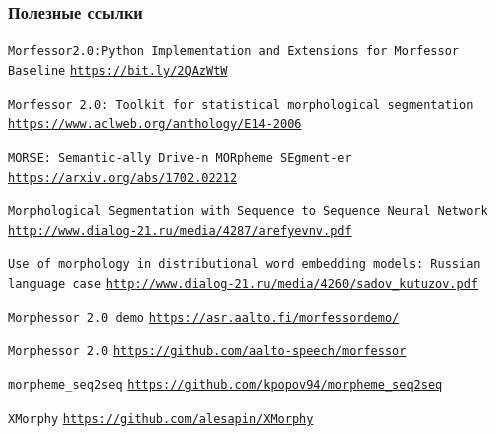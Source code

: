 \documentclass[10pt]{beamer}
\begin{document}
\begin{frame}[allowframebreaks]
  \frametitle<presentation>{Полезные ссылки}
    
  \begin{thebibliography}{10}
{
  \beamertemplatearticlebibitems
  
  \texttt{Morfessor2.0:Python Implementation and Extensions for Morfessor Baseline}
  \newblock \href{https://aaltodoc.aalto.fi/bitstream/handle/123456789/11836/isbn9789526055015.pdf}{\texttt{https://bit.ly/2QAzWtW}}
 
  \texttt{Morfessor 2.0: Toolkit for statistical morphological segmentation}
  \newblock \href{https://www.aclweb.org/anthology/E14-2006}{\texttt{https://www.aclweb.org/anthology/E14-2006}}
  
  \texttt{MORSE: Semantic-ally Drive-n MORpheme SEgment-er}
  \newblock \href{https://arxiv.org/abs/1702.02212}{\texttt{https://arxiv.org/abs/1702.02212}}
  
  \texttt{Morphological Segmentation with Sequence to Sequence Neural Network}
  \newblock \href{http://www.dialog-21.ru/media/4287/arefyevnv.pdf}{\texttt{http://www.dialog-21.ru/media/4287/arefyevnv.pdf}}
  
  \texttt{Use of morphology in distributional word embedding models:
Russian language case}
  \newblock \href{http://www.dialog-21.ru/media/4260/sadov\_kutuzov.pdf}{\texttt{http://www.dialog-21.ru/media/4260/sadov\_kutuzov.pdf}}

\beamertemplateonlinebibitems
{}
  \texttt{Morphessor 2.0 demo}
  \newblock \href{https://asr.aalto.fi/morfessordemo/}{\texttt{https://asr.aalto.fi/morfessordemo/}}

  \texttt{Morphessor 2.0}
  \newblock \href{https://github.com/aalto-speech/morfessor}{\texttt{https://github.com/aalto-speech/morfessor}}
  
  \texttt{morpheme\_seq2seq}
  \newblock \href{https://github.com/kpopov94/morpheme\_seq2seq}{\texttt{https://github.com/kpopov94/morpheme\_seq2seq}}
  
  \texttt{XMorphy}
  \newblock \href{https://github.com/alesapin/XMorphy}{\texttt{https://github.com/alesapin/XMorphy}}
  
  
  
}

    
  \end{thebibliography}
\end{frame}
\end{document}
